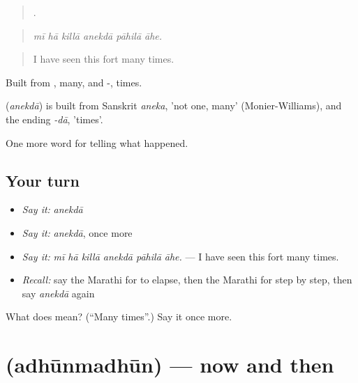 \begin{quote}
     .
\end{quote}

\begin{quote}
\emph{mī hā killā anekdā pāhilā āhe.}
\end{quote}

\begin{quote}
I have seen this fort many times.
\end{quote}

Built from , many, and -, times.

\begin{cousinweb}
\textbf{} (\emph{anekdā}) is built from Sanskrit \emph{aneka}, 'not one, many' (Monier-Williams), and the ending \emph{-dā}, 'times'.
\end{cousinweb}

\begin{grammarlens}[title={What you've built}]
One more word for telling what happened.
\end{grammarlens}

\subsection*{Your turn}
\begin{itemize}
\raggedright
  \item \emph{Say it:} \emph{anekdā}
  \item \emph{Say it:} \emph{anekdā}, once more
  \item \emph{Say it:} \emph{mī hā killā anekdā pāhilā āhe.} — I have seen this fort many times.
  \item \emph{Recall:} say the Marathi for to elapse, then the Marathi for step by step, then say \emph{anekdā} again
\end{itemize}

\begin{tcolorbox}[breakable,colback=teal!4,colframe=teal!35!black,title={Before you move on}]
What does  mean? (\textquotedblleft{}Many times\textquotedblright{}.) Say it once more.
\end{tcolorbox}
\section[\texorpdfstring{\mr{अधूनमधून} (adhūnmadhūn)}{अधूनमधून (adhūnmadhūn)}]{ (adhūnmadhūn) — now and then}

